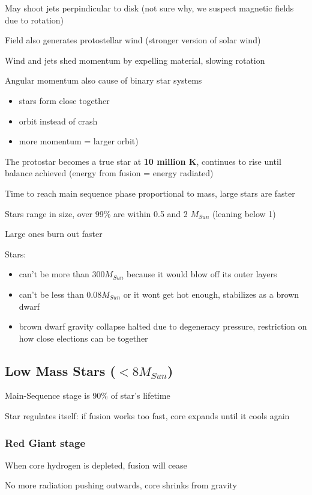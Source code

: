 May shoot jets perpindicular to disk (not sure why, we suspect magnetic fields due to rotation)

Field also generates protostellar wind (stronger version of solar wind)

Wind and jets shed momentum by expelling material, slowing rotation

Angular momentum also cause of binary star systems
\begin{itemize}
\item stars form close together
\item orbit instead of crash
\item more momentum = larger orbit)
\end{itemize}

The protostar becomes a true star at {\bf 10 million K}, continues to rise until balance achieved (energy from fusion = energy radiated)

Time to reach main sequence phase proportional to mass, large stars are faster

Stars range in size, over 99\% are within 0.5 and 2 $M_{Sun}$ (leaning below 1)

Large ones burn out faster

Stars:
\begin{itemize}
\item can't be more than $300 M_{Sun}$ because it would blow off its outer layers
\item can't be less than $0.08 M_{Sun}$ or it wont get hot enough, stabilizes as a brown dwarf
\item brown dwarf gravity collapse halted due to degeneracy pressure, restriction on how close elections can be together
\end{itemize}

\subsection{Low Mass Stars ($<8 M_{Sun}$)}
Main-Sequence stage is 90\% of star's lifetime

Star regulates itself: if fusion works too fast, core expands until it cools again

\subsubsection{Red Giant stage}
When core hydrogen is depleted, fusion will cease

No more radiation pushing outwards, core shrinks from gravity

